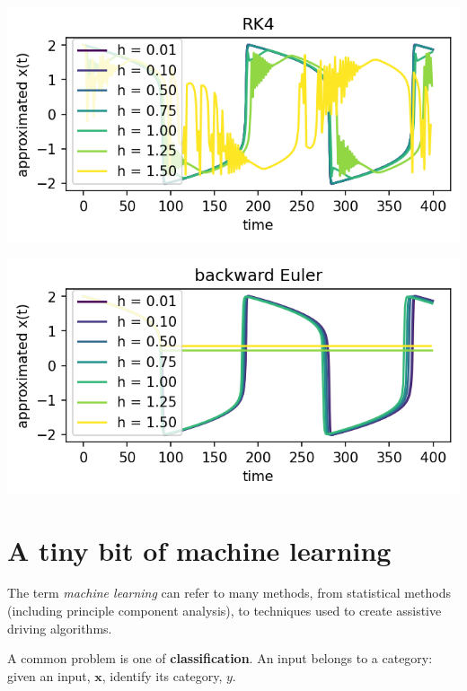 \documentclass[12pt,letterpaper,noanswers]{exam}
\newcommand{\vc}[1]{\boldsymbol{#1}}
\begin{document}
\includegraphics{AM111-F23-CourseNotes/img/C22-RK4.png}

\includegraphics{AM111-F23-CourseNotes/img/C22-bck.png}


\section*{A tiny bit of machine learning}
The term \emph{machine learning} can refer to many methods, from statistical methods (including principle component analysis), to techniques used to create assistive driving algorithms.

A common problem is one of \textbf{classification}.  An input belongs to a category: given an input, $\vc{x}$, identify its category, $y$.
\end{document}
